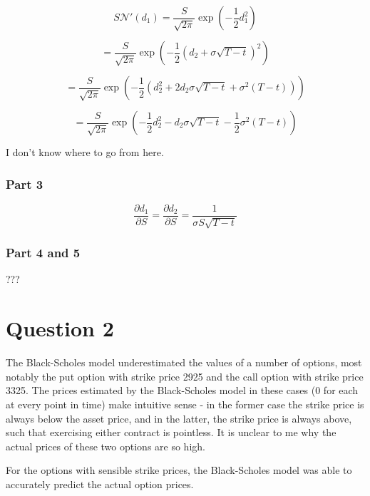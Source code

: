 \documentclass[12pt]{article}
\begin{document}
	$$S\mathcal{N}'(d_1) = \frac{S}{\sqrt{2\pi}} \exp\left(-\frac{1}{2} d_1^2\right)$$

	$$= \frac{S}{\sqrt{2\pi}} \exp\left(-\frac{1}{2} \left(d_2 + \sigma\sqrt{T - t}\right)^2\right)$$

	$$= \frac{S}{\sqrt{2\pi}} \exp\left(-\frac{1}{2} \left(d_2^2 + 2d_2\sigma\sqrt{T - t} + \sigma^2(T - t)\right)\right)$$

	$$= \frac{S}{\sqrt{2\pi}} \exp\left(-\frac{1}{2}d_2^2 - d_2\sigma\sqrt{T - t} - \frac{1}{2}\sigma^2(T - t)\right)$$

	I don't know where to go from here.

	\subsubsection{Part 3}

	$$\frac{\partial d_1}{\partial S} = \frac{\partial d_2}{\partial S} = \frac{1}{\sigma S \sqrt{T - t}}$$

	\subsubsection{Part 4 and 5}

	???

	\section{Question 2}

	The Black-Scholes model underestimated the values of a number of options, most notably the put option with strike price 2925 and the call option with strike price 3325. The prices estimated by the Black-Scholes model in these cases (0 for each at every point in time) make intuitive sense - in the former case the strike price is always below the asset price, and in the latter, the strike price is always above, such that exercising either contract is pointless. It is unclear to me why the actual prices of these two options are so high.

	For the options with sensible strike prices, the Black-Scholes model was able to accurately predict the actual option prices.
\end{document}
